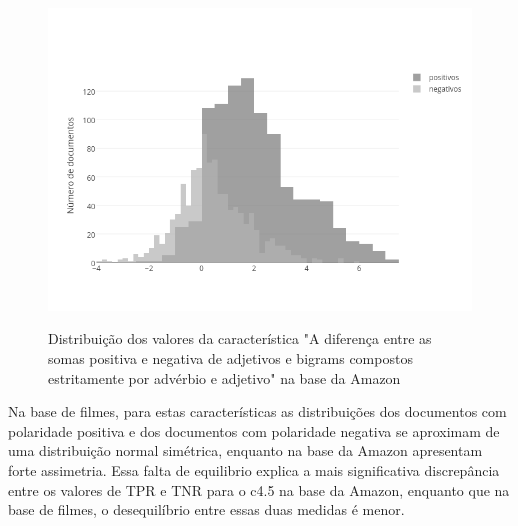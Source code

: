 \documentclass[template.tex]{subfiles}
\begin{document}
\begin{figure}[phtb]
\caption{Distribuição dos valores da característica "A diferença entre as somas positiva e negativa de adjetivos e bigrams compostos estritamente por advérbio e adjetivo" na base da Amazon}
\centering
\includegraphics[scale=0.7]{amazon_positive_to_negative_ratio_of_unigrams_and_bigrams_sum}
\label{figura:amazon_dist_2}
\end{figure}

Na base de filmes, para estas características as distribuições dos documentos com polaridade positiva e dos documentos com polaridade negativa se aproximam de uma distribuição normal simétrica, enquanto na base da Amazon apresentam forte assimetria. Essa falta de equilibrio explica a mais significativa discrepância entre os valores de TPR  e TNR para o c4.5 na base da Amazon, enquanto que na base de filmes, o desequilíbrio entre essas duas medidas é menor. 

\end{document}
